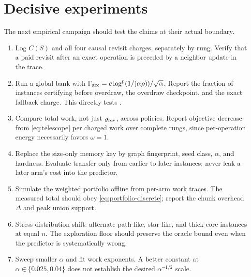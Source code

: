 \section{Decisive experiments}
\label{sec:experiments}

The next empirical campaign should test the claims at their actual boundary.

\begin{enumerate}[leftmargin=*]
 \item Log $C(S)$ and all four causal revisit charges, separately by rung.
 Verify that a paid revisit after an exact operation is preceded by a
 neighbor update in the trace.
 \item Run a global bank with
 $\Gamma_{\rm acc}=c\log^p(1/(\alpha\rho))/\sqrt\alpha$.  Report the fraction
 of instances certifying before overdraw, the overdraw checkpoint, and the
 exact fallback charge.  This directly tests .
 \item Compare total work, not just $\varrho_{\rm rev}$, across policies.
 Report objective decrease from \eqref{eq:telescope} per charged work over
 complete rungs, since per-operation energy necessarily favors $\omega=1$.
 \item Replace the size-only memory key by graph fingerprint, seed class,
 $\alpha$, and hardness.  Evaluate transfer only from earlier to later
 instances; never leak a later arm's cost into the predictor.
 \item Simulate the weighted portfolio offline from per-arm work traces.  The
 measured total should obey \eqref{eq:portfolio-discrete}; report the chunk
 overhead $\Delta$ and peak union support.
 \item Stress distribution shift: alternate path-like, star-like, and
 thick-core instances at equal $n$.  The exploration floor should preserve
 the oracle bound even when the predictor is systematically wrong.
 \item Sweep smaller $\alpha$ and fit work exponents.  A better constant at
 $\alpha\in\{0.025,0.04\}$ does not establish the desired
 $\alpha^{-1/2}$ scale.
\end{enumerate}
